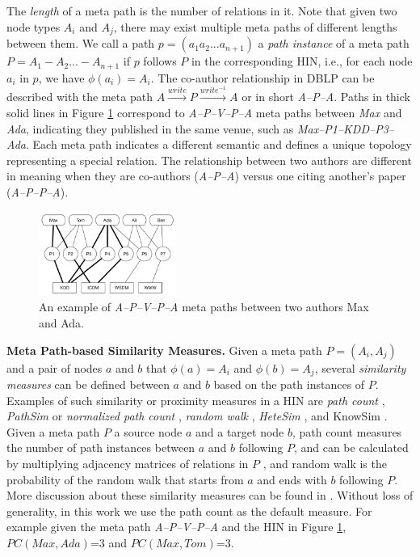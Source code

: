 The \textit{length} of a meta path is the number of relations in it. Note that given two node types $A_i$ and $A_j$, there may exist multiple meta paths of different lengths between them. We call a path $p = (a_1a_2...a_{n+1})$ a \textit{path instance} of a meta path $P = A_1-A_2... -A_{n+1}$ if $p$ follows $P$ in the corresponding HIN, i.e., for each node $a_i$ in $p$, we have $\phi(a_i)=A_i$. The co-author relationship in DBLP can be described with the meta path $A\xrightarrow{write}P\xrightarrow{write^{-1}}A$ or in short \textit{A--P--A}. Paths in thick solid lines in Figure \ref{sampleNetwork} correspond to \textit{A--P--V--P--A} meta paths between \textit{Max} and \textit{Ada}, indicating they published in the same venue, such as \textit{Max--P1--KDD--P3--Ada}. %
Each meta path indicates a different semantic and defines a unique topology representing a special relation. The relationship between two authors are different in meaning when they are co-authors (\textit{A--P--A}) versus one citing another's paper (\textit{A--P--P--A}).

\begin{figure}[t]
  \centering
      \includegraphics[width=0.4\textwidth]{figs/exampleSocialNetwork.pdf}
  \caption{An example of \textit{A--P--V--P--A} meta paths between two authors Max and Ada.}\label{sampleNetwork}
\end{figure}

\textbf{Meta Path-based Similarity Measures.} Given a meta path $P = (A_i,A_j)$ and a pair of nodes $a$ and $b$ that $\phi(a)=A_i$ and $\phi(b)=A_{j}$, several \textit{similarity measures} can be defined between $a$ and $b$ based on the path instances of $P$. Examples of such similarity or proximity measures in a HIN are \textit{path count} \cite{sun2011pathsim,sun2011ASONAM}, \textit{PathSim} \cite{sun2011pathsim} or \textit{normalized path count} \cite{sun2011ASONAM}, \textit{random walk} \cite{sun2011ASONAM}, \textit{HeteSim} \cite{shi2014hetesim}, and KnowSim \cite{wang2016text}. Given a meta path $P$ a source node $a$ and a target node $b$, path count measures the number of path instances between $a$ and $b$ following $P$, and can be calculated by multiplying adjacency matrices of relations in $P$ \cite{sun2011ASONAM}, and random walk is the probability of the random walk that starts from $a$ and ends with $b$ following $P$. More discussion about these similarity measures can be found in \cite{shi2014hetesim,sun2011ASONAM,sun2011pathsim}. Without loss of generality, in this work we use the path count as the default measure. For example given the meta path \textit{A--P--V--P--A} and the HIN in Figure \ref{sampleNetwork}, $PC(Max,Ada)$=3 and $PC(Max,Tom)$=3. 

